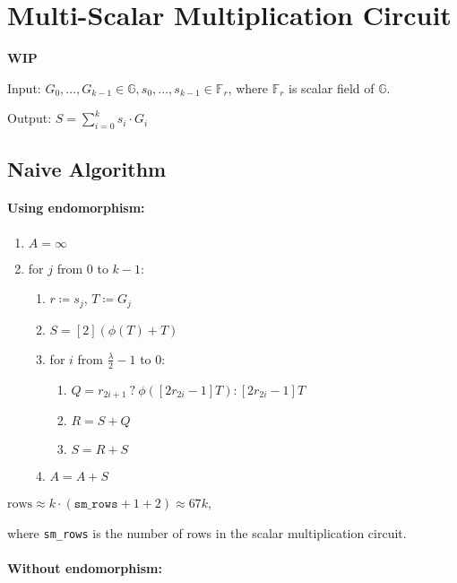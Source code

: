 \section{Multi-Scalar Multiplication Circuit}
\label{section:msm}
\textbf{WIP}

Input: $G_0, ..., G_{k - 1} \in \mathbb{G}, s_0, ..., s_{k - 1} \in \mathbb{F}_r$, where $\mathbb{F}_r$ is scalar field of $\mathbb{G}$.


Output: $S = \sum\limits_{i = 0}^{k}s_i \cdot G_i$

\subsection{Naive Algorithm}
\paragraph{Using endomorphism:} 

\begin{enumerate}
	\item $A = \infty$
	\item for $j$ from $0$ to $k-1$:
	\begin{enumerate}
		\item $r \coloneqq s_j$, $T \coloneqq G_j$
		\item $S = [2](\phi(T) + T)$
		\item for $i$ from $\frac{\lambda}{2} - 1$ to $0$:
		\begin{enumerate}
			\item $Q = r_{2i + 1} \: ? \: \phi([2r_{2i} - 1]T) : [2r_{2i} - 1]T$
			\item $R = S + Q$
			\item $S = R + S$
		\end{enumerate}
		\item $A = A + S$
	\end{enumerate}
\end{enumerate}

\begin{center}
	$\text{rows} \approx k \cdot (\texttt{sm\_rows} + 1 + 2) \approx 67k$,
\end{center}
where \texttt{sm\_rows} is the number of rows in the scalar multiplication circuit. 

\paragraph{Without endomorphism:}

